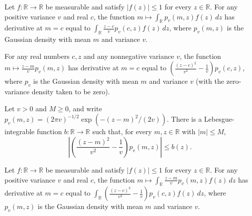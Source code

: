 \begin{lemma}
\leanok
{}
Let $f:\mathbb R\to\mathbb R$ be measurable and satisfy $|f(z)|\le1$ for every
$z\in\mathbb R$. For any positive variance $v$ and real $c$, the function
$m\mapsto\int_{\mathbb R}p_v(m,z)f(z)\,dz$ has derivative at $m=c$ equal to
$\int_{\mathbb R}\frac{z-c}{v}p_v(c,z)f(z)\,dz$, where $p_v(m,z)$ is the Gaussian
density with mean $m$ and variance $v$.
\end{lemma}

\begin{lemma}
\leanok
{}
For any real numbers $c,z$ and any nonnegative variance $v$, the function $m\mapsto
\frac{z-m}{v}p_v(m,z)$ has derivative at $m=c$ equal to
$\left(\frac{(z-c)^2}{v^2}-\frac1v\right)p_v(c,z)$, where $p_v$ is the Gaussian density
with mean $m$ and variance $v$ (with the zero-variance density taken to be zero).
\end{lemma}

\begin{lemma}
\leanok
{}
Let $v>0$ and $M\ge0$, and write $p_v(m,z)=(2\pi v)^{-1/2}\exp(-(z-m)^2/(2v))$. There is
a Lebesgue-integrable function $b:\mathbb R\to\mathbb R$ such that, for every
$m,z\in\mathbb R$ with $|m|\le M$,
\[\left|\left(\frac{(z-m)^2}{v^2}-\frac1v\right)p_v(m,z)\right|\le b(z).\]
\end{lemma}

\begin{lemma}
\leanok
{}
Let $f:\mathbb R\to\mathbb R$ be measurable and satisfy $|f(z)|\le1$ for every
$z\in\mathbb R$. For any positive variance $v$ and real $c$, the function
$m\mapsto\int_{\mathbb R}\frac{z-m}{v}p_v(m,z)f(z)\,dz$ has derivative at $m=c$ equal to
$\int_{\mathbb R}\left(\frac{(z-c)^2}{v^2}-\frac1v\right)p_v(c,z)f(z)\,dz$, where
$p_v(m,z)$ is the Gaussian density with mean $m$ and variance $v$.
\end{lemma}

